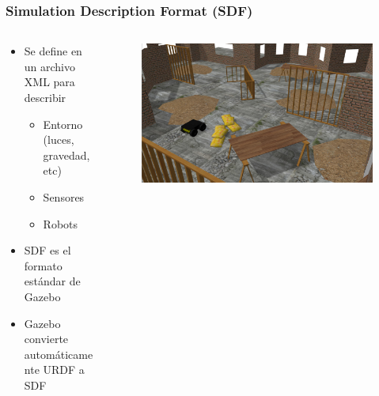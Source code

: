 \begin{frame}
    \frametitle{Simulation Description Format (SDF)}
    \footnotesize
   	\begin{columns}
    	\begin{column}{0.5\textwidth}
    		\begin{itemize}
    			\item Se define en un archivo XML para describir
	    		\begin{itemize}
    				\item Entorno (luces, gravedad, etc)
					\item Sensores
					\item Robots
    			\end{itemize}
			\item SDF es el formato estándar de Gazebo
			\item Gazebo convierte automáticamente URDF a SDF 
    		\end{itemize}
    	\end{column}
    	\begin{column}{0.5\textwidth}
    		\begin{figure}[!h]
    			\centering
				\includegraphics[width=\columnwidth]{images/sdf_gazebo.jpg}
    		\end{figure}
    	\end{column}
    \end{columns}
    
\end{frame}

